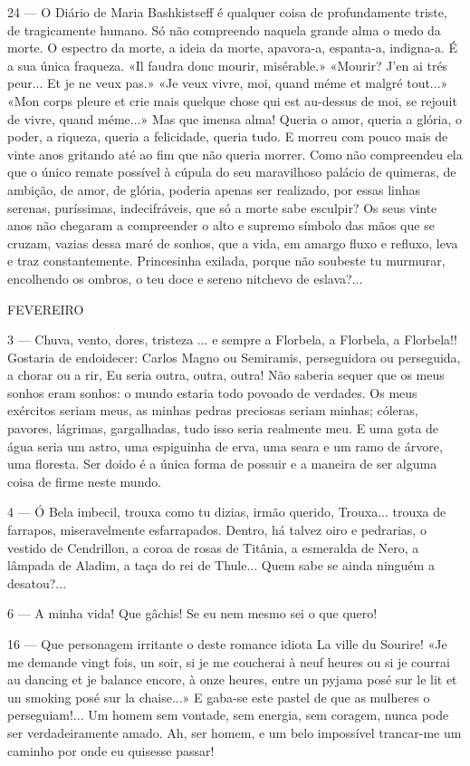 24 — O Diário de Maria Bashkistseff é qualquer coisa
de profundamente triste, de tragicamente humano. Só
não compreendo naquela grande alma o medo da
morte. O espectro da morte, a ideia da morte, 
apavora-a, espanta-a, indigna-a. É a sua única fraqueza.
«Il faudra donc mourir, misérable.» «Mourir? J’en ai
trés peur... Et je ne veux pas.» «Je veux vivre, moi,
quand méme et malgré tout...» «Mon corps pleure et
crie mais quelque chose qui est au-dessus de moi, se
rejouit de vivre, quand méme...» Mas que imensa
alma! Queria o amor, queria a glória, o poder, a
riqueza, queria a felicidade, queria tudo. E morreu com
pouco mais de vinte anos gritando até ao fim que
não queria morrer. Como não compreendeu ela que o
único remate possível à cúpula do seu maravilhoso
palácio de quimeras, de ambição, de amor, de glória,
poderia apenas ser realizado, por essas linhas serenas,
puríssimas, indecifráveis, que só a morte sabe 
esculpir? Os seus vinte anos não chegaram a compreender
o alto e supremo símbolo das mãos que se cruzam,
vazias dessa maré de sonhos, que a vida, em amargo
fluxo e refluxo, leva e traz constantemente. 
Princesinha exilada, porque não soubeste tu murmurar, 
encolhendo os ombros, o teu doce e sereno nitchevo
de eslava?...

FEVEREIRO

3 — Chuva, vento, dores, tristeza ... e sempre a 
Florbela, a Florbela, a Florbela!! Gostaria de endoidecer:
Carlos Magno ou Semiramis, perseguidora ou 
perseguida, a chorar ou a rir, Eu seria outra, outra, outra!
Não saberia sequer que os meus sonhos eram sonhos:
o mundo estaria todo povoado de verdades. Os meus
exércitos seriam meus, as minhas pedras preciosas seriam
minhas; cóleras, pavores, lágrimas, gargalhadas, tudo isso
seria realmente meu. E uma gota de água seria um astro,
uma espiguinha de erva, uma seara e um ramo de 
árvore, uma floresta. Ser doido é a única forma de possuir
e a maneira de ser alguma coisa de firme neste
mundo.

4 — Ó Bela imbecil, trouxa como tu dizias, irmão
querido, Trouxa... trouxa de farrapos, miseravelmente
esfarrapados. Dentro, há talvez oiro e pedrarias, o
vestido de Cendrillon, a coroa de rosas de Titânia,
a esmeralda de Nero, a lâmpada de Aladim, a taça
do rei de Thule... Quem sabe se ainda ninguém a
desatou?...

6 — A minha vida! Que gâchis! Se eu nem mesmo sei
o que quero!

16 — Que personagem irritante o deste romance idiota
La ville du Sourire! «Je me demande vingt fois,
un soir, si je me coucherai à neuf heures ou si je courrai
au dancing et je balance encore, à onze heures, entre
un pyjama posé sur le lit et un smoking posé sur la
chaise...» E gaba-se este pastel de que as mulheres o
perseguiam!... Um homem sem vontade, sem energia,
sem coragem, nunca pode ser verdadeiramente amado.
Ah, ser homem, e um belo impossível trancar-me um
caminho por onde eu quisesse passar!

